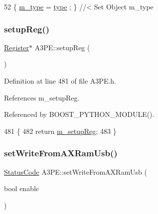 \begin{DoxyCode}
52 \{ \hyperlink{classObject_a457a600fe8c00eb1034374f75110a78c}{m\_type}  = \hyperlink{classObject_a84f99f70f144a83e1582d1d0f84e4e62}{type}  ; \} \textcolor{comment}{//< Set Object m\_type}
\end{DoxyCode}
\mbox{\label{classA3PE_a94d96383e441153ed01e82cc12d2f593}} 
\subsubsection{\texorpdfstring{setup\+Reg()}{setupReg()}}
{\footnotesize\ttfamily \hyperlink{classRegister}{Register}$\ast$ A3\+P\+E\+::setup\+Reg (\begin{DoxyParamCaption}{ }\end{DoxyParamCaption})\hspace{0.3cm}{\ttfamily [inline]}}



Definition at line 481 of file A3\+P\+E.\+h.



References m\+\_\+setup\+Reg.



Referenced by B\+O\+O\+S\+T\+\_\+\+P\+Y\+T\+H\+O\+N\+\_\+\+M\+O\+D\+U\+L\+E().


\begin{DoxyCode}
481                       \{
482     \textcolor{keywordflow}{return} \hyperlink{classA3PE_a142fa10b7e705c4701ae21678ec2ec8a}{m\_setupReg};
483   \}
\end{DoxyCode}
\mbox{\label{classA3PE_aeb276fae7f19c45b4b4a3a5a2b99c337}} 
\subsubsection{\texorpdfstring{set\+Write\+From\+A\+X\+Ram\+Usb()}{setWriteFromAXRamUsb()}}
{\footnotesize\ttfamily \hyperlink{classStatusCode}{Status\+Code} A3\+P\+E\+::set\+Write\+From\+A\+X\+Ram\+Usb (\begin{DoxyParamCaption}\item[{bool}]{enable }\end{DoxyParamCaption})}



